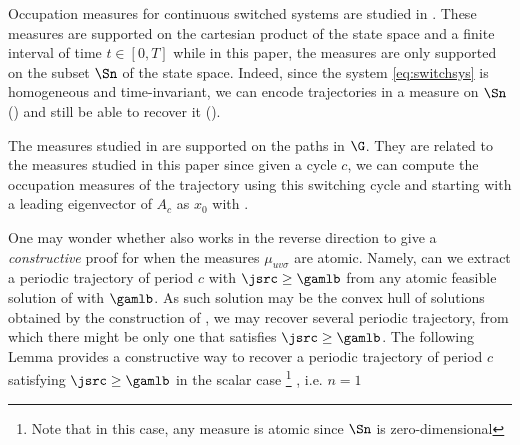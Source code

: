 \begin{myrem}
  Occupation measures for continuous switched systems are studied in \cite{claeys2016modal}.
  These measures are supported on the cartesian product of the state space and a finite interval of time $t \in [0, T]$
  while in this paper, the measures are only supported on the subset $\Sn$ of the state space.
  Indeed, since the system \eqref{eq:switchsys} is homogeneous and time-invariant, we can encode trajectories in a measure on $\Sn$ () and
  still be able to recover it ().

  The measures studied in \cite{hare2011explicit} are supported on the paths in $\G$.
  They are related to the measures studied in this paper since given a cycle $c$,
  we can compute the occupation measures of the trajectory using this switching cycle and starting with a leading eigenvector of $A_c$ as $x_0$ with .
\end{myrem}



One may wonder whether  also works in the reverse direction to give a \emph{constructive} proof for  when the measures $\mu_{uv\sigma}$ are atomic.
Namely, can we extract a periodic trajectory of period $c$ with $\jsrc \geq \gamlb$ from any atomic feasible solution of  with $\gamlb$.
As such solution may be the convex hull of solutions obtained by the construction of , we may recover several periodic trajectory, from which there might be only one that satisfies $\jsrc \geq \gamlb$.
The following Lemma provides a constructive way to recover a periodic trajectory of period $c$ satisfying $\jsrc \geq \gamlb$ in the scalar case%
\footnote{Note that in this case, any measure is atomic since $\Sn$ is zero-dimensional}%
, i.e. $n = 1$%





